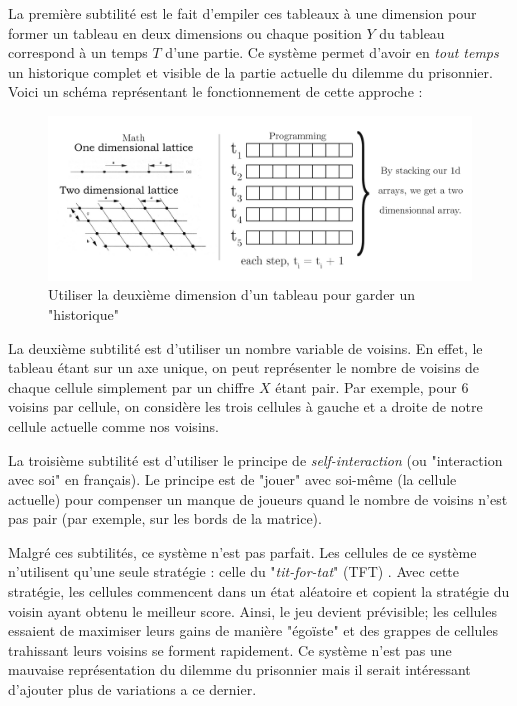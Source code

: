 \documentclass[a4paper]{article}
\begin{document}
La première subtilité est le fait d'empiler ces tableaux à une dimension pour former un tableau en deux dimensions ou chaque position $Y$ du tableau correspond à un temps $T$ d'une partie. Ce système permet d'avoir en \textit{tout temps} un historique complet et visible de la partie actuelle du dilemme du prisonnier. Voici un schéma représentant le fonctionnement de cette approche :

\begin{figure}[htp]
    \centering
    \includegraphics[width=\linewidth]{arrays.png}
    \caption{Utiliser la deuxième dimension d'un tableau pour garder un "historique"}
\end{figure}

La deuxième subtilité est d'utiliser un nombre variable de voisins. En effet, le tableau étant sur un axe unique, on peut représenter le nombre de voisins de chaque cellule simplement par un chiffre $X$ étant pair. Par exemple, pour 6 voisins par cellule, on considère les trois cellules à gauche et a droite de notre cellule actuelle comme nos voisins.

La troisième subtilité est d'utiliser le principe de \textit{self-interaction} (ou "interaction avec soi" en français). Le principe est de "jouer" avec soi-même (la cellule actuelle) pour compenser un manque de joueurs quand le nombre de voisins n'est pas pair (par exemple, sur les bords de la matrice).

Malgré ces subtilités, ce système n'est pas parfait. Les cellules de ce système n'utilisent qu'une seule stratégie : celle du "\textit{tit-for-tat}" (TFT) \cite{StratIPD}. Avec cette stratégie, les cellules commencent dans un état aléatoire et copient la stratégie du voisin ayant obtenu le meilleur score. Ainsi, le jeu devient prévisible; les cellules essaient de maximiser leurs gains de manière "égoïste" et des grappes de cellules trahissant leurs voisins se forment rapidement. Ce système n'est pas une mauvaise représentation du dilemme du prisonnier mais il serait intéressant d'ajouter plus de variations a ce dernier.
\end{document}
